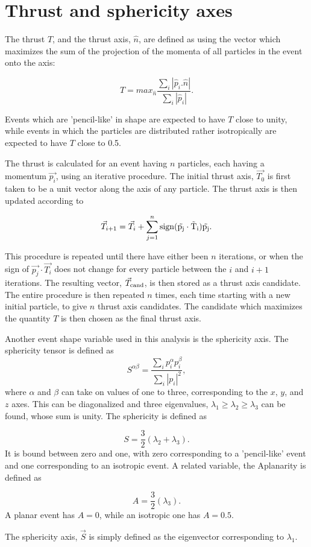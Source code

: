 \section{Thrust and sphericity axes}

The thrust $T$, and the thrust axis, $\hat{n}$, are defined as using the vector which maximizes the sum of the projection of the momenta of all particles in the event onto the axis:

\begin{equation}
T = max_{\hat{n}} \frac {\sum_i \left| \hat{p}_i . \hat{n} \right|}{\sum_i \left| \hat{p}_i \right|}.
\end{equation}

Events which are 'pencil-like' in shape are expected to have $T$ close to unity, while events in which the particles are distributed rather isotropically are expected to have $T$ close to 0.5.  

The thrust is calculated for an event having $n$ particles, each having a momentum $\vec{p_{i}}$, using an iterative procedure. The initial thrust axis, $\vec{T_0}$ is first taken to be a unit vector along the axis of any particle.  The thrust axis is then updated according to

\begin{equation}
\vec{T}_{i+1} = \vec{T}_{i}+\sum\limits_{j=1}^n  \rm{sign}(\vec{p_j}\cdot\vec{T}_i)\vec{p_{j}}.
\end{equation}

This procedure is repeated until there have either been $n$ iterations, or when the sign of $\vec{p_j}\cdot\vec{T_i}$ does not change for every particle between the $i$ and $i+1$ iterations.  The resulting vector, $\vec{T}_{\rm{cand}}$, is then stored as a thrust axis candidate.  The entire procedure is then repeated $n$ times, each time starting with a new initial particle, to give $n$ thrust axis candidates.  The candidate which maximizes the quantity $T$ is then chosen as the final thrust axis.

Another event shape variable used in this analysis is the sphericity axis.  The sphericity tensor is defined as
\begin{equation}
S^{\alpha\beta}=\frac{\sum\limits_{i}p_{i}^{\alpha}p_{i}^{\beta}}{\sum\limits_{i}|p_{i}|^2},
\end{equation}
where $\alpha$ and $\beta$ can take on values of one to three, corresponding to the $x$, $y$, and $z$ axes.  This can be diagonalized and three eigenvalues, $\lambda_{1}\geq\lambda_{2}\geq\lambda_{3}$ can be found, whose sum is unity.  The sphericity is defined as

\begin{equation}
S=\frac{3}{2}(\lambda_{2}+\lambda_{3}).
\end{equation}
It is bound between zero and one, with zero corresponding to a 'pencil-like' event and one corresponding to an isotropic event.  A related variable, the Aplanarity is defined as

\begin{equation}
A=\frac{3}{2}(\lambda_{3}).
\end{equation}
A planar event has $A=0$, while an isotropic one has $A=0.5$.

The sphericity axis, $\vec{S}$ is simply defined as the eigenvector corresponding to $\lambda_1$.